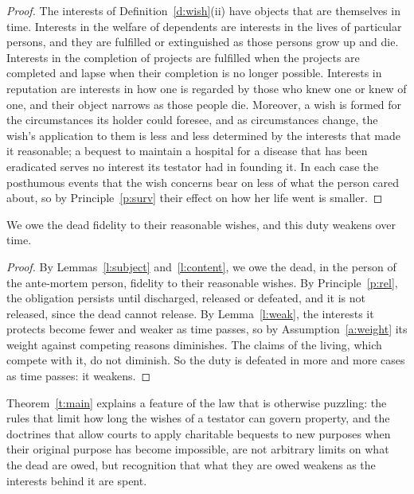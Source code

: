 \documentclass{situationist-preprint}
\begin{document}
\begin{proof}
The interests of Definition~\ref{d:wish}(ii) have objects that are themselves in time. Interests in the welfare of dependents are interests in the lives of particular persons, and they are fulfilled or extinguished as those persons grow up and die. Interests in the completion of projects are fulfilled when the projects are completed and lapse when their completion is no longer possible. Interests in reputation are interests in how one is regarded by those who knew one or knew of one, and their object narrows as those people die. Moreover, a wish is formed for the circumstances its holder could foresee, and as circumstances change, the wish's application to them is less and less determined by the interests that made it reasonable; a bequest to maintain a hospital for a disease that has been eradicated serves no interest its testator had in founding it. In each case the posthumous events that the wish concerns bear on less of what the person cared about, so by Principle~\ref{p:surv} their effect on how her life went is smaller.
\end{proof}

\begin{theorem}\label{t:main}
We owe the dead fidelity to their reasonable wishes, and this duty weakens over time.
\end{theorem}

\begin{proof}
By Lemmas~\ref{l:subject} and~\ref{l:content}, we owe the dead, in the person of the ante-mortem person, fidelity to their reasonable wishes. By Principle~\ref{p:rel}, the obligation persists until discharged, released or defeated, and it is not released, since the dead cannot release. By Lemma~\ref{l:weak}, the interests it protects become fewer and weaker as time passes, so by Assumption~\ref{a:weight} its weight against competing reasons diminishes. The claims of the living, which compete with it, do not diminish. So the duty is defeated in more and more cases as time passes: it weakens.
\end{proof}

Theorem~\ref{t:main} explains a feature of the law that is otherwise puzzling: the rules that limit how long the wishes of a testator can govern property, and the doctrines that allow courts to apply charitable bequests to new purposes when their original purpose has become impossible, are not arbitrary limits on what the dead are owed, but recognition that what they are owed weakens as the interests behind it are spent.
\end{document}
